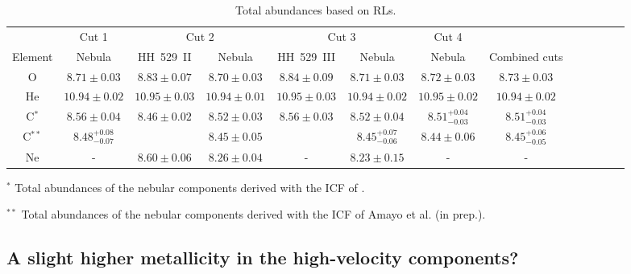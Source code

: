 \documentclass[fleqn,usenatbib]{mnras}
\begin{document}
\begin{table*}
\centering
\caption{Total abundances based on RLs.}
\label{tab:total_abundances_rls}
\begin{adjustbox}{width=\textwidth}
\begin{tabular}{ccccccccccccc}
\hline
 & \multicolumn{1}{c}{Cut 1} & \multicolumn{2}{c}{Cut 2} & \multicolumn{2}{c}{Cut 3} & \multicolumn{1}{c}{Cut 4} \\
Element &  Nebula & HH~529~II &  Nebula & HH~529~III &  Nebula &  Nebula & Combined cuts\\
\hline

O & $8.71 \pm 0.03$ & $8.83 \pm 0.07$ & $8.70 \pm 0.03$ &$8.84 \pm 0.09$ & $8.71 \pm 0.03$ & $8.72 \pm 0.03$ & $8.73 \pm 0.03$\\

He & $10.94 \pm 0.02$ & $10.95\pm 0.03$ &$10.94 \pm 0.01$ & $10.95\pm 0.03$ & $10.94 \pm 0.02$& $10.95 \pm 0.02$ & $10.94 \pm 0.02$ \\

C$^{*}$ & $8.56 \pm 0.04$ & \multirow{ 2}{*}{$ 8.46 \pm 0.02$}&$8.52 \pm 0.03$&\multirow{ 2}{*}{$ 8.56 \pm 0.03$}& $8.52 \pm 0.04$& $8.51 ^{+0.04} _{-0.03}$& $8.51 ^{+0.04} _{-0.03}$\\

C$^{**}$ & $8.48 ^{+0.08} _{-0.07}$ & &$8.45 \pm 0.05$& &$8.45 ^{+0.07} _{-0.06}$&$8.44 \pm 0.06$ & $8.45 ^{+0.06} _{-0.05}$\\


Ne &-&$8.60\pm 0.06$&$8.26 \pm 0.04$&-&$8.23 \pm 0.15$&-&-\\

\hline
\end{tabular}
\end{adjustbox}
\begin{description}
\item $^*$ Total abundances of the nebular components derived with the ICF of \citet{berg19}.\\
\item $^{**}$ Total abundances of the nebular components derived with the ICF of Amayo et al. (in prep.).\\
\end{description}
\end{table*}






\subsection{A slight higher metallicity in the high-velocity components?}
\label{subsec:overmetal}
\end{document}
